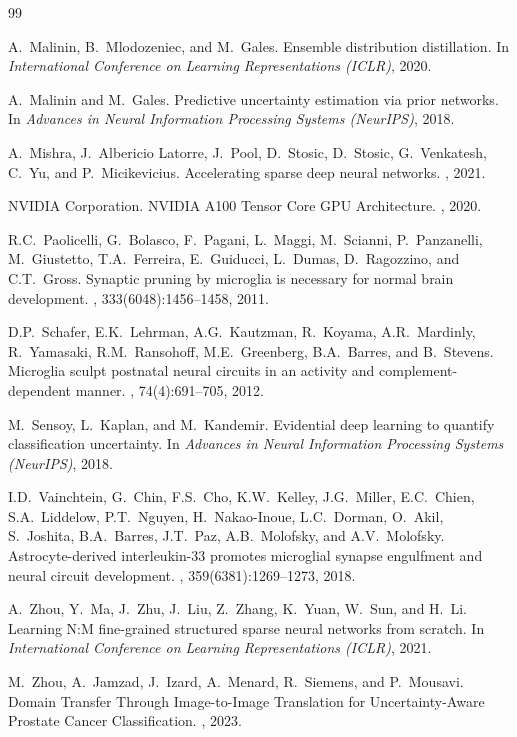 \documentclass[11pt, a4paper]{article}
\begin{document}
\begin{thebibliography}{99}

A.~Malinin, B.~Mlodozeniec, and M.~Gales.
\newblock Ensemble distribution distillation.
\newblock In {\em International Conference on Learning Representations (ICLR)}, 2020.


A.~Malinin and M.~Gales.
\newblock Predictive uncertainty estimation via prior networks.
\newblock In {\em Advances in Neural Information Processing Systems (NeurIPS)}, 2018.

A.~Mishra, J.~Albericio Latorre, J.~Pool, D.~Stosic, D.~Stosic, G.~Venkatesh, C.~Yu, and P.~Micikevicius.
\newblock Accelerating sparse deep neural networks.
, 2021.

NVIDIA Corporation.
\newblock NVIDIA A100 Tensor Core GPU Architecture.
, 2020.

R.C.~Paolicelli, G.~Bolasco, F.~Pagani, L.~Maggi, M.~Scianni, P.~Panzanelli, M.~Giustetto, T.A.~Ferreira, E.~Guiducci, L.~Dumas, D.~Ragozzino, and C.T.~Gross.
\newblock Synaptic pruning by microglia is necessary for normal brain development.
, 333(6048):1456--1458, 2011.

D.P.~Schafer, E.K.~Lehrman, A.G.~Kautzman, R.~Koyama, A.R.~Mardinly, R.~Yamasaki, R.M.~Ransohoff, M.E.~Greenberg, B.A.~Barres, and B.~Stevens.
\newblock Microglia sculpt postnatal neural circuits in an activity and complement-dependent manner.
, 74(4):691--705, 2012.

M.~Sensoy, L.~Kaplan, and M.~Kandemir.
\newblock Evidential deep learning to quantify classification uncertainty.
\newblock In {\em Advances in Neural Information Processing Systems (NeurIPS)}, 2018.

I.D.~Vainchtein, G.~Chin, F.S.~Cho, K.W.~Kelley, J.G.~Miller, E.C.~Chien, S.A.~Liddelow, P.T.~Nguyen, H.~Nakao-Inoue, L.C.~Dorman, O.~Akil, S.~Joshita, B.A.~Barres, J.T.~Paz, A.B.~Molofsky, and A.V.~Molofsky.
\newblock Astrocyte-derived interleukin-33 promotes microglial synapse engulfment and neural circuit development.
, 359(6381):1269--1273, 2018.


A.~Zhou, Y.~Ma, J.~Zhu, J.~Liu, Z.~Zhang, K.~Yuan, W.~Sun, and H.~Li.
\newblock Learning N:M fine-grained structured sparse neural networks from scratch.
\newblock In {\em International Conference on Learning Representations (ICLR)}, 2021.

M.~Zhou, A.~Jamzad, J.~Izard, A.~Menard, R.~Siemens, and P.~Mousavi.
\newblock Domain Transfer Through Image-to-Image Translation for Uncertainty-Aware Prostate Cancer Classification.
, 2023.

\end{thebibliography}
\end{document}
